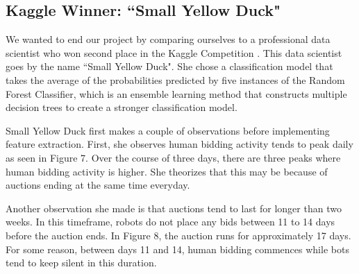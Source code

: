 \documentclass{article} %
\begin{document}
\subsection{Kaggle Winner: ``Small Yellow Duck"}

We wanted to end our project by comparing ourselves to a professional data scientist who won second place in the Kaggle Competition \cite{SYD}. This data scientist goes by the name ``Small Yellow Duck".
She chose a classification model that takes the average of the probabilities predicted by five instances of the Random Forest Classifier, which is an ensemble learning method that constructs multiple decision trees to create a stronger classification model.

Small Yellow Duck first makes a couple of observations before implementing feature extraction.
First, she observes human bidding activity tends to peak daily as seen in Figure 7. %
Over the course of three days, there are three peaks where human bidding activity is higher.
She theorizes that this may be because of auctions ending at the same time everyday.


\begin{figure}[h]
\centering
{}
\end{figure}

Another observation she made is that auctions tend to last for longer than two weeks.
In this timeframe, robots do not place any bids between 11 to 14 days before the auction ends.
In Figure 8, the auction runs for approximately 17 days. %
For some reason, between days 11 and 14, human bidding commences while bots tend to keep silent in this duration.
\end{document}
